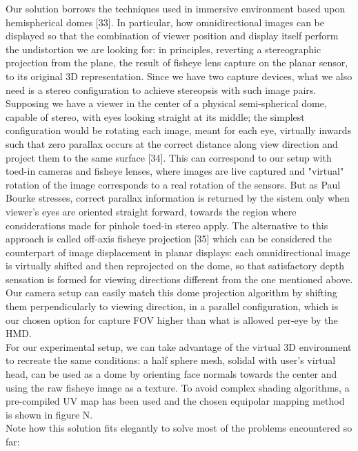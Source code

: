 Our solution borrows the techniques used in immersive environment based upon hemispherical domes [33]. In particular, how omnidirectional images can be displayed so that the combination of viewer position and display itself perform the undistortion we are looking for: in principles, reverting a stereographic projection from the plane, the result of fisheye lens capture on the planar sensor, to its original 3D representation. Since we have two capture devices, what we also need is a stereo configuration to achieve stereopsis with such image pairs. Supposing we have a viewer in the center of a physical semi-spherical dome, capable of stereo, with eyes looking straight at its middle; the simplest configuration would be rotating each image, meant for each eye,  virtually inwards such that zero parallax occurs at the correct distance along view direction and project them to the same surface [34]. This can correspond to our setup with toed-in cameras and fisheye lenses, where images are live captured and "virtual" rotation of the image corresponds to a real rotation of the sensors. But as Paul Bourke stresses, correct parallax information is returned by the sistem only when viewer’s eyes are oriented straight forward, towards the region where considerations made for pinhole toed-in stereo apply. The alternative to this approach is called off-axis fisheye projection [35] which can be considered the counterpart of image displacement in planar displays: each omnidirectional image is virtually shifted and then reprojected on the dome, so that satisfactory depth sensation is formed for viewing directions different from the one mentioned above. Our camera setup can easily match this dome projection algorithm by shifting them perpendicularly to viewing direction, in a parallel configuration, which is our chosen option for capture FOV higher than what is allowed per-eye by the HMD.\\
For our experimental setup, we can take advantage of the virtual 3D environment to recreate the same conditions: a half sphere mesh, solidal with user’s virtual head,  can be used as a dome by orienting face normals towards the center and using the raw fisheye image as a texture. To avoid complex shading algorithms, a pre-compiled UV map has been used and the chosen equipolar mapping method is shown in figure N.\\
Note how this solution fits elegantly to solve most of the problems encountered so far:
